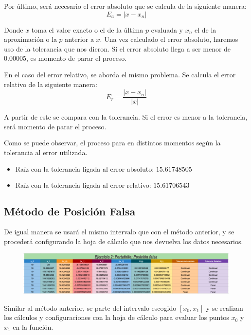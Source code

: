 \documentclass{article}
\begin{document}
Por último, será necesario el error absoluto que se calcula de la siguiente manera:
\[E_a = |x - x_n|\]

Donde \(x\) toma el valor exacto o el de la última \(p\) evaluada y \(x_n\) el de la aproximación o la \(p\) anterior a \(x\). Una vez calculado el error absoluto, haremos uso de la tolerancia que nos dieron. Si el error absoluto llega a ser menor de \(0.00005\), es momento de parar el proceso.

En el caso del error relativo, se aborda el mismo problema. Se calcula el error relativo de la siguiente manera:
\[E_r = \frac{|x - x_n|}{|x|}\]

A partir de este se compara con la tolerancia. Si el error es menor a la tolerancia, será momento de parar el proceso.

Como se puede observar, el proceso para en distintos momentos según la tolerancia al error utilizada.
\begin{itemize}
    \item Raíz con la tolerancia ligada al error absoluto: \(15.61748505\)
    \item Raíz con la tolerancia ligada al error relativo: \(15.61706543\)
\end{itemize}

\subsection{Método de Posición Falsa}
De igual manera se usará el mismo intervalo que con el método anterior, y se procederá configurando la hoja de cálculo que nos devuelva los datos necesarios.
\\
\begin{figure}[h]
    \raggedleft
    \includegraphics[scale=0.3]{Falsa.png}
    \end{figure}

Similar al método anterior, se parte del intervalo escogido \([x_0, x_1]\) y se realizan los cálculos y configuraciones con la hoja de cálculo para evaluar los puntos \(x_0\) y \(x_1\) en la función.
\end{document}
